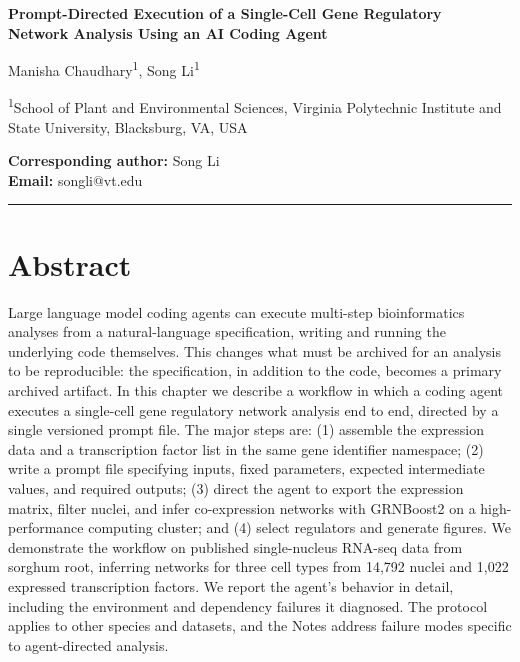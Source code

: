 \begin{singlespace}
\begin{flushleft}
\setlength{\parskip}{0pt}
{\Large\bfseries Prompt-Directed Execution of a Single-Cell Gene Regulatory\\ Network Analysis Using an AI Coding Agent\par}

\vspace{0.6em}

{\large Manisha Chaudhary\textsuperscript{1}, Song Li\textsuperscript{1}\par}

\vspace{0.4em}

\textsuperscript{1}School of Plant and Environmental Sciences, Virginia Polytechnic Institute and State University, Blacksburg, VA, USA

\vspace{0.4em}

\textbf{Corresponding author:} Song Li \\
\textbf{Email:} songli@vt.edu

\end{flushleft}
\end{singlespace}

\vspace{0.8em}
\hrule
\vspace{0.8em}

\section*{Abstract}

Large language model coding agents can execute multi-step bioinformatics analyses from a natural-language specification, writing and running the underlying code themselves. This changes what must be archived for an analysis to be reproducible: the specification, in addition to the code, becomes a primary archived artifact. In this chapter we describe a workflow in which a coding agent executes a single-cell gene regulatory network analysis end to end, directed by a single versioned prompt file. The major steps are: (1) assemble the expression data and a transcription factor list in the same gene identifier namespace; (2) write a prompt file specifying inputs, fixed parameters, expected intermediate values, and required outputs; (3) direct the agent to export the expression matrix, filter nuclei, and infer co-expression networks with GRNBoost2 on a high-performance computing cluster; and (4) select regulators and generate figures. We demonstrate the workflow on published single-nucleus RNA-seq data from sorghum root, inferring networks for three cell types from 14,792 nuclei and 1,022 expressed transcription factors. We report the agent's behavior in detail, including the environment and dependency failures it diagnosed. The protocol applies to other species and datasets, and the Notes address failure modes specific to agent-directed analysis.

